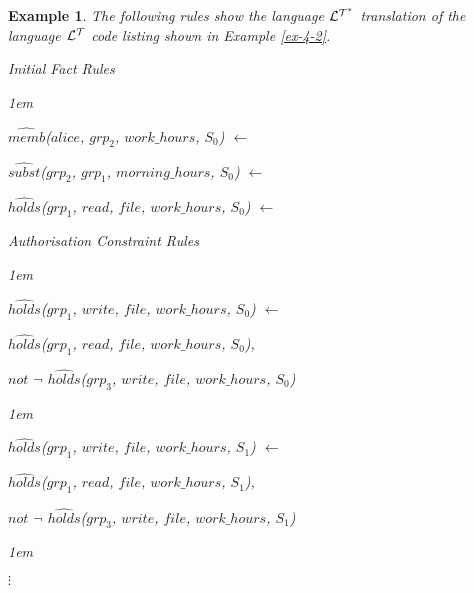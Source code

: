 \documentclass[11pt]{report}
\newtheorem{vexample}{Example}[chapter]
\newenvironment{vquote}
{
  \begin{list}{}{\leftmargin 1em}\item[]
}
{
  \end{list}
}
\begin{document}
        \begin{vexample}
          \label{ex-4-3}
          The following rules show the language ${\cal L^{T^*}}$ translation
          of the language ${\cal L^T}$ code listing shown in Example
          \ref{ex-4-2}.

          \begin{enumerate}
            \item
              Initial Fact Rules

              \begin{vquote}
  $\hat{memb}$($alice$, $grp_2$, $work\_hours$, $S_0$) $\leftarrow$

  $\hat{subst}$($grp_2$, $grp_1$, $morning\_hours$, $S_0$) $\leftarrow$

  $\hat{holds}$($grp_1$, $read$, $file$, $work\_hours$, $S_0$) $\leftarrow$
              \end{vquote}

            \item
              Authorisation Constraint Rules

              \begin{vquote}
                $\hat{holds}$($grp_1$, $write$, $file$, $work\_hours$, $S_0$) $\leftarrow$

                \hspace{1em}
                $\hat{holds}$($grp_1$, $read$, $file$, $work\_hours$, $S_0$),

                \hspace{1em}
                $not$ $\lnot$ $\hat{holds}$($grp_3$, $write$, $file$, $work\_hours$, $S_0$)
              \end{vquote}

              \begin{vquote}
                $\hat{holds}$($grp_1$, $write$, $file$, $work\_hours$, $S_1$) $\leftarrow$

                \hspace{1em}
                $\hat{holds}$($grp_1$, $read$, $file$, $work\_hours$, $S_1$),

                \hspace{1em}
                $not$ $\lnot$ $\hat{holds}$($grp_3$, $write$, $file$, $work\_hours$, $S_1$)
              \end{vquote}

              \begin{vquote}
                \hspace{1em}
                $\vdots$
              \end{vquote}


\end{enumerate}
\end{vexample}
\end{document}
